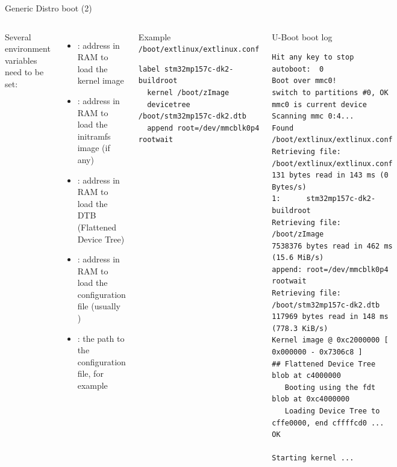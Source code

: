\begin{frame}[fragile]{Generic Distro boot (2)}
  \begin{columns}
  \small
  Several environment variables need to be set:
  \begin{itemize}
     \item {}: address in RAM to load the kernel image
     \item {}: address in RAM to load the initramfs image (if any)
     \item {}: address in RAM to load the DTB (Flattened
           Device Tree)
     \item {}: address in RAM to load the
           configuration file (usually )
     \item {}: the path to the configuration file,
           for example 
  \end{itemize}
  \begin{block}{Example {\tt /boot/extlinux/extlinux.conf}}
    {\tiny
\begin{verbatim}
label stm32mp157c-dk2-buildroot
  kernel /boot/zImage
  devicetree /boot/stm32mp157c-dk2.dtb
  append root=/dev/mmcblk0p4 rootwait
\end{verbatim}
    }
  \end{block}

  \begin{block}{U-Boot boot log}
    {\tiny
\begin{verbatim}
Hit any key to stop autoboot:  0
Boot over mmc0!
switch to partitions #0, OK
mmc0 is current device
Scanning mmc 0:4...
Found /boot/extlinux/extlinux.conf
Retrieving file: /boot/extlinux/extlinux.conf
131 bytes read in 143 ms (0 Bytes/s)
1:      stm32mp157c-dk2-buildroot
Retrieving file: /boot/zImage
7538376 bytes read in 462 ms (15.6 MiB/s)
append: root=/dev/mmcblk0p4 rootwait
Retrieving file: /boot/stm32mp157c-dk2.dtb
117969 bytes read in 148 ms (778.3 KiB/s)
Kernel image @ 0xc2000000 [ 0x000000 - 0x7306c8 ]
## Flattened Device Tree blob at c4000000
   Booting using the fdt blob at 0xc4000000
   Loading Device Tree to cffe0000, end cffffcd0 ... OK

Starting kernel ...
\end{verbatim}
    }
  \end{block}
  \end{columns}
\end{frame}
